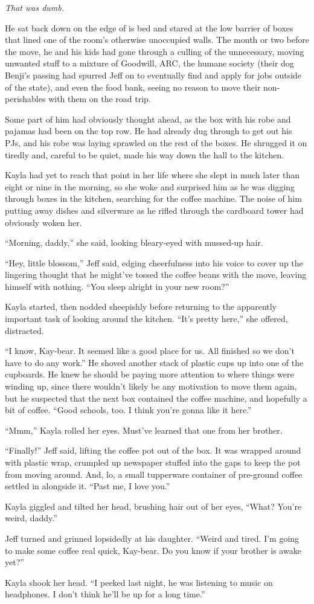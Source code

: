 \textit{That was dumb.}

He sat back down on the edge of is bed and stared at the low barrier of boxes that lined one of the room's otherwise unoccupied walls.  The month or two before the move, he and his kids had gone through a culling of the unnecessary, moving unwanted stuff to a mixture of Goodwill, ARC, the humane society (their dog Benji's passing had spurred Jeff on to eventually find and apply for jobs outside of the state), and even the food bank, seeing no reason to move their non-perishables with them on the road trip.

Some part of him had obviously thought ahead, as the box with his robe and pajamas had been on the top row.  He had already dug through to get out his PJs, and his robe was laying sprawled on the rest of the boxes.  He shrugged it on tiredly and, careful to be quiet, made his way down the hall to the kitchen.

Kayla had yet to reach that point in her life where she slept in much later than eight or nine in the morning, so she woke and surprised him as he was digging through boxes in the kitchen, searching for the coffee machine.  The noise of him putting away dishes and silverware as he rifled through the cardboard tower had obviously woken her.

``Morning, daddy,'' she said, looking bleary-eyed with mussed-up hair.

``Hey, little blossom,'' Jeff said, edging cheerfulness into his voice to cover up the lingering thought that he might've tossed the coffee beans with the move, leaving himself with nothing.  ``You sleep alright in your new room?''

Kayla started, then nodded sheepishly before returning to the apparently important task of looking around the kitchen.  ``It's pretty here,'' she offered, distracted.

``I know, Kay-bear.  It seemed like a good place for us.  All finished so we don't have to do any work.''  He shoved another stack of plastic cups up into one of the cupboards.  He knew he should be paying more attention to where things were winding up, since there wouldn't likely be any motivation to move them again, but he suspected that the next box contained the coffee machine, and hopefully a bit of coffee.  ``Good schools, too.  I think you're gonna like it here.''

``Mmm,'' Kayla rolled her eyes.  Must've learned that one from her brother.

``Finally!'' Jeff said, lifting the coffee pot out of the box.  It was wrapped around with plastic wrap, crumpled up newspaper stuffed into the gaps to keep the pot from moving around.  And, lo, a small tupperware container of pre-ground coffee settled in alongside it.  ``Past me, I love you.''

Kayla giggled and tilted her head, brushing hair out of her eyes, ``What?  You're weird, daddy.''

Jeff turned and grinned lopsidedly at his daughter.  ``Weird and tired.  I'm going to make some coffee real quick, Kay-bear.  Do you know if your brother is awake yet?''

Kayla shook her head.  ``I peeked last night, he was listening to music on headphones.  I don't think he'll be up for a long time.''
